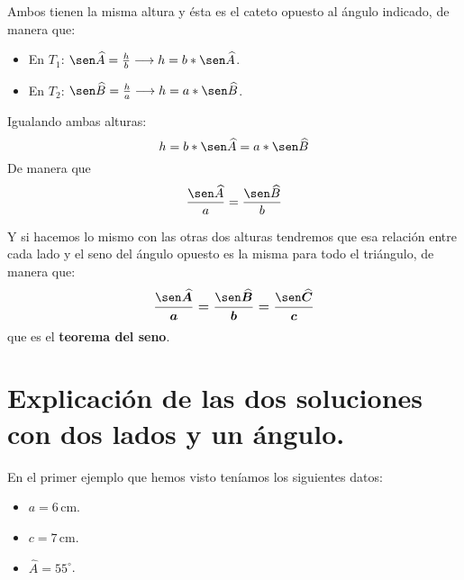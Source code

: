 \documentclass[a4paper,11pt,answers]{exam}
\newcommand{\degree}{^\circ}
\begin{document}
Ambos tienen la misma altura y ésta es el cateto opuesto al ángulo indicado, de manera que:
\begin{itemize}
\item En $T_1$: $\sen \widehat{A} = \frac{h}{b} \longrightarrow h = b*\sen \widehat{A}$.
\item En $T_2$: $\sen \widehat{B} = \frac{h}{a} \longrightarrow h = a*\sen \widehat{B}$.
\end{itemize}
Igualando ambas alturas:
\[h = b*\sen \widehat{A} = a*\sen \widehat{B}\]
De manera que
\[\frac{\sen \widehat{A}}{a} = \frac{\sen \widehat{B}}{b}\]

Y si hacemos lo mismo con las otras dos alturas tendremos que esa relación entre cada lado y el
seno del ángulo opuesto es la misma para todo el triángulo, de manera que:
\[\boldsymbol{\frac{\sen \widehat{A}}{a} = \frac{\sen \widehat{B}}{b} =
    \frac{\sen \widehat{C}}{c}}\]
que es el \textbf{teorema del seno}.
\section{Explicación de las dos soluciones con dos lados y un ángulo.}\label{apendice_dossoluciones}
En el primer ejemplo que hemos visto teníamos los siguientes datos:
\begin{itemize}
\item $a=6$\,cm.
\item $c=7$\,cm.
\item $\widehat{A} = 55\degree$.
\end{itemize}
\end{document}
